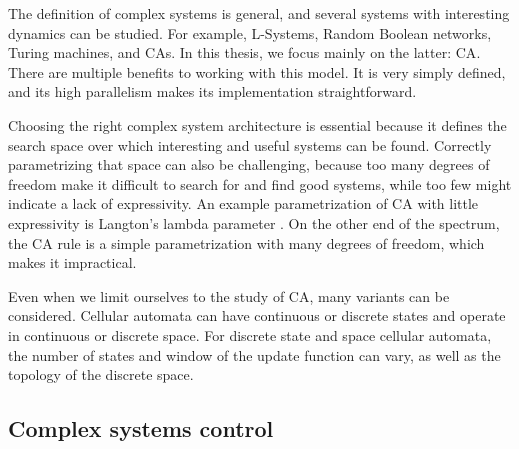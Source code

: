 The definition of complex systems is general, and several systems with
interesting dynamics can be studied. For example, L-Systems, Random Boolean
networks, Turing machines, and \Acfp{CA}. In this thesis, we focus mainly on the
latter: \acl{CA}. There are multiple benefits to working with this model. It is
very simply defined, and its high parallelism makes its implementation
straightforward.

Choosing the right complex system architecture is essential because it defines
the search space over which interesting and useful systems can be found.
Correctly parametrizing that space can also be challenging, because too many
degrees of freedom make it difficult to search for and find good systems, while
too few might indicate a lack of expressivity. An example parametrization of
\ac{CA} with little expressivity is Langton's lambda parameter
\parencite{langton_computation_1990}. On the other end of the spectrum, the
\ac{CA} rule is a simple parametrization with many degrees of freedom, which
makes it impractical.

Even when we limit ourselves to the study of \ac{CA}, many variants can be
considered. Cellular automata can have continuous or discrete states and operate
in continuous or discrete space. For discrete state and space cellular automata,
the number of states and window of the update function can vary, as well as the
topology of the discrete space.


\subsection{Complex systems control}\label{sec:compl-syst-contr}

